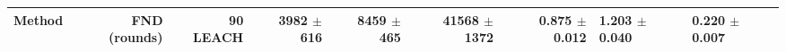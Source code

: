 \begin{tabular}{lrrrrrr}
\toprule
Method & FND (rounds) & 90 %
\midrule
LEACH & 3982 $\pm$ 616 & 8459 $\pm$ 465 & 41568 $\pm$ 1372 & 0.875 $\pm$ 0.012 & 1.203 $\pm$ 0.040 & 0.220 $\pm$ 0.007 \\
\bottomrule
\end{tabular}